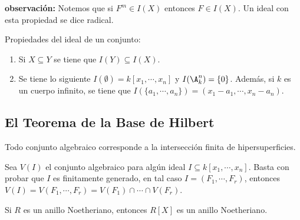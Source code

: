 \documentclass{article}
\begin{document}
\noindent\textbf{observación:} Notemos que si $F^{m}\in I(X)$ entonces $F\in I(X)$. Un ideal con
esta propiedad se dice radical.
\vspace{4mm}

\noindent Propiedades del ideal de un conjunto:
\begin{enumerate}
    \item Si $X\subseteq Y$ se tiene que $I(Y)\subseteq I(X)$.
    \item Se tiene lo siguiente $I(\emptyset)=k[x_{1},\cdots,x_{n}]$ y $I(\A_{k}^{n})=\{0\}$.
    Además, si $k$ es un cuerpo infinito, se tiene que $I(\{a_{1},\cdots,a_{n}\})=
    (x_{1}-a_{1},\cdots,x_{n}-a_{n})$.
\end{enumerate}

\subsection{El Teorema de la Base de Hilbert}
\begin{teo}
    Todo conjunto algebraico corresponde a la intersección finita de hipersuperficies.
\end{teo}

\begin{dem}
    Sea $V(I)$ el conjunto algebraico para algún ideal $I\subseteq k[x_{1},\cdots,x_{n}]$. 
    Basta con probar que $I$ es finitamente generado, en tal caso $I=(F_{1},\cdots,F_{r})$, 
    entonces $V(I)=V(F_{1},\cdots,F_{r})=V(F_{1})\cap\cdots\cap V(F_{r})$.
\end{dem}

\begin{teo}
    Si $R$ es un anillo Noetheriano, entonces $R[X]$ es un anillo Noetheriano.
\end{teo}
\end{document}
